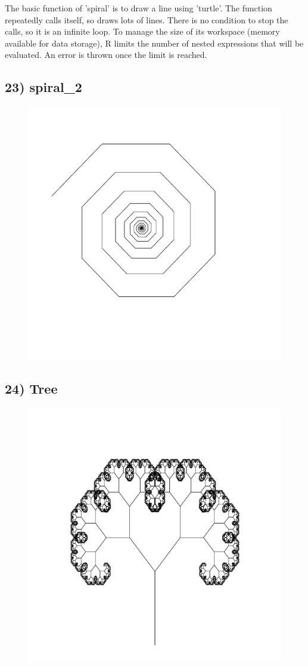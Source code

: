 \documentclass[11pt]{article}
\begin{document}
The basic function of 'spiral' is to draw a line using 'turtle'. The function repeatedly calls itself, so draws lots of lines. There is no condition to stop the calls, so it is an infinite loop. To manage the size of its workspace (memory available for data storage), R limits the number of nested expressions that will be evaluated. An error is thrown once the limit is reached.

\subsection*{23) spiral\_2}
\begin{figure}[h]
\includegraphics[width=0.5\linewidth]{../Results/23_spiral_2.pdf}
\end{figure}

\newpage

\subsection*{24) Tree}
\begin{figure}[h]
\includegraphics[width=0.5\linewidth]{../Results/24_tree.pdf}
\end{figure}

\newpage
\end{document}
